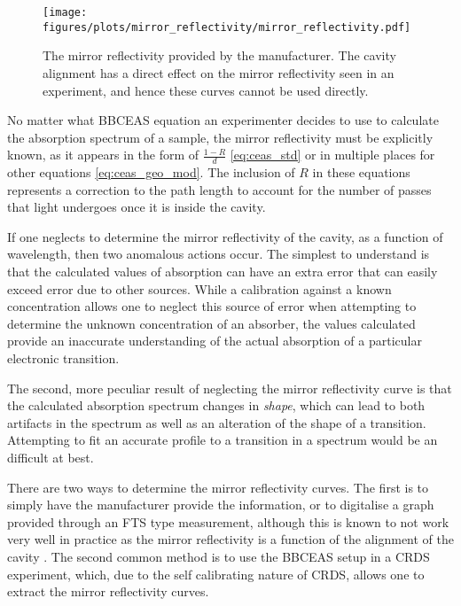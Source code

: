 \begin{figure}
\begin{center}
  \texttt{[image: figures/plots/mirror\_reflectivity/mirror\_reflectivity.pdf]}
\end{center}
\caption[Cavity Mirror Reflectivity]{The mirror reflectivity provided by the manufacturer. The cavity alignment has a direct effect on the mirror reflectivity seen in an experiment, and hence these curves cannot be used directly.}
\label{fig:mirror}
\end{figure}

No matter what \ac{BBCEAS} equation an experimenter decides to use to calculate
the absorption spectrum of a sample, the mirror reflectivity must be explicitly
known, as it appears in the form of $\tfrac{1-R}{d}$ \eqref{eq:ceas_std} or in
multiple places for other equations \eqref{eq:ceas_geo_mod}. The inclusion of
$R$ in these equations represents a correction to the path length to account
for the number of passes that light undergoes once it is inside the cavity.

If one neglects to determine the mirror reflectivity of the cavity, as a
function of wavelength, then two anomalous actions occur. The simplest to
understand is that the calculated values of absorption can have an extra error
that can easily exceed error due to other sources. While a calibration against
a known concentration allows one to neglect this source of error when
attempting to determine the unknown concentration of an absorber, the values
calculated provide an inaccurate understanding of the actual absorption of a
particular electronic transition.

The second, more peculiar result of neglecting the mirror reflectivity curve is
that the calculated absorption spectrum changes in \emph{shape}, which  can
lead to both artifacts in the spectrum as well as an alteration of the shape of
a transition. Attempting to fit an accurate profile to a transition in a
spectrum would be an difficult at best.

There are two ways to determine the mirror reflectivity curves. The first is
to simply have the manufacturer provide the information, or to digitalise a
graph provided through an \ac{FTS} type measurement, although this is known to
not work very well in practice as the mirror reflectivity is a function of the
alignment of the cavity \cite{Berden:2009wk}. The second common method is to
use the \ac{BBCEAS} setup in a \ac{CRDS} experiment, which, due to the self
calibrating nature of \ac{CRDS}, allows one to extract the mirror reflectivity
curves.



